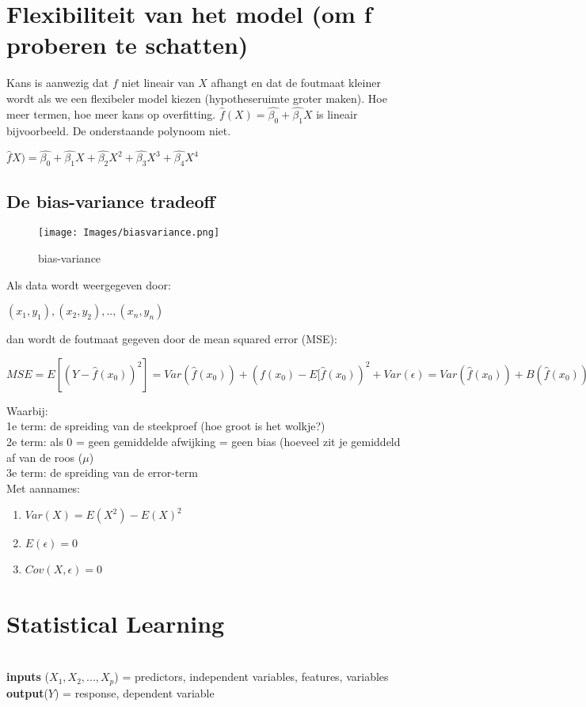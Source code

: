 {\section{Flexibiliteit van het model (om f proberen te schatten)} 
\noindent Kans is aanwezig dat $f$ niet lineair van $X$ afhangt en dat de foutmaat kleiner wordt als we een flexibeler model kiezen (hypotheseruimte groter maken). Hoe meer termen, hoe meer kans op overfitting. $\hat{f}(X)=\hat{\beta_0}+\hat{\beta_1}X$ is lineair bijvoorbeeld. De onderstaande polynoom niet.\\
\begin{center}
$\hat{f}X)=\hat{\beta_0}+\hat{\beta_1}X+\hat{\beta_2}X^2+\hat{\beta_3}X^3+\hat{\beta_4}X^4$
\end{center}

\subsection{De bias-variance tradeoff}
\begin{figure}[h]
    \centering
    \texttt{[image: Images/biasvariance.png]}
    \caption{bias-variance}
    \label{fig:biasvariance}
\end{figure}
Als data wordt weergegeven door:
\begin{center}
    $(x_1,y_1),(x_2,y_2),..,(x_n,y_n)$
\end{center}
dan wordt de foutmaat gegeven door de mean squared error (MSE):
\begin{center}
    $MSE=E[(Y-\hat{f}(x_0))^2]=Var(\hat{f}(x_0))+(f(x_0)-E[\hat{f}(x_0))^2+Var(\epsilon)=Var(\hat{f}(x_0))+B(\hat{f}(x_0))^2+Var(\epsilon)$
\end{center}
\noindent Waarbij:\\
1e term: de spreiding van de steekproef (hoe groot is het wolkje?) \\
2e term: als 0 = geen gemiddelde afwijking = geen bias (hoeveel zit je gemiddeld af van de roos ($\mu$)\\
3e term: de spreiding van de error-term\\
Met aannames:
\begin{enumerate}
    \item $Var(X)=E(X^2)-E(X)^2$
    \item $E(\epsilon)=0$
    \item $Cov(X,\epsilon)=0$
\end{enumerate}


\section{Statistical Learning} \vspace{1mm}\\
\noindent \textbf{inputs} ($X_1, X_2,..., X_p$) = predictors, independent variables, features, variables\\
\textbf{output}($Y$) = response, dependent variable\\

}
